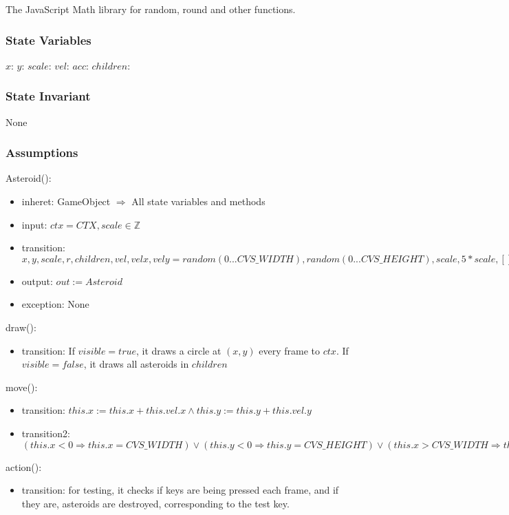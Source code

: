 \documentclass[12pt]{article}
\begin{document}
The JavaScript Math library for random, round and other functions.

\subsubsection* {State Variables}

$x$:
$y$:
$scale$:
$vel$:
$acc$:
$children$:

\subsubsection* {State Invariant}

None

\subsubsection* {Assumptions}

Asteroid():
\begin{itemize}
    \item inheret: GameObject $\Rightarrow$ All state variables and methods
    \item input: $ctx = CTX, scale \in \mathbb{Z}$
    \item transition: $ x, y, scale, r, children, vel, velx, vely = random(0...CVS\_WIDTH), random(0...CVS\_HEIGHT), scale, 5*scale, [],
    random(-1...1) * 3,
    random(-1...1) * 3$
    \item output: $out := Asteroid$
    \item exception: None
\end{itemize}

draw():
\begin{itemize}
  \item transition: If $visible = true$, it draws a circle at $(x,y)$ every frame to $ctx$. If $visible = false$, it draws all asteroids in $children$
\end{itemize}

move():
\begin{itemize}
  \item transition: $this.x := this.x + this.vel.x \land this.y := this.y + this.vel.y$
  \item transition2: $(this.x < 0 \Rightarrow this.x = CVS\_WIDTH) \lor (this.y < 0 \Rightarrow this.y = CVS\_HEIGHT) \lor (this.x > CVS\_WIDTH \Rightarrow this.x = 0) \lor (this.y > CVS\_HEIGHT \Rightarrow this.y = 0)$
\end{itemize}

action():
\begin{itemize}
    \item transition: for testing, it checks if keys are being pressed each frame, and if they are, asteroids are destroyed, corresponding to the test key.
\end{itemize}
\end{document}
